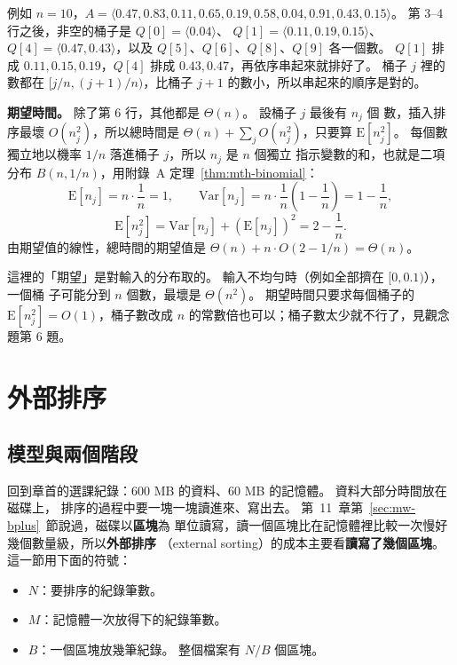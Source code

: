 例如 $n = 10$，$A = \langle 0.47, 0.83, 0.11, 0.65, 0.19, 0.58, 0.04, 0.91, 0.43,
0.15 \rangle$。 第 3--4 行之後，非空的桶子是 $Q[0] = \langle 0.04 \rangle$、
$Q[1] = \langle 0.11, 0.19, 0.15 \rangle$、$Q[4] = \langle 0.47, 0.43 \rangle$，以及
$Q[5]$、$Q[6]$、$Q[8]$、$Q[9]$ 各一個數。 $Q[1]$ 排成 $0.11, 0.15, 0.19$，$Q[4]$ 排成 $0.43, 0.47$，再依序串起來就排好了。 桶子
$j$ 裡的數都在 $[j/n, (j+1)/n)$，比桶子 $j + 1$ 的數小，所以串起來的順序是對的。

\textbf{期望時間。} 除了第 6 行，其他都是 $\Theta(n)$。 設桶子 $j$ 最後有 $n_j$ 個
數，插入排序最壞 $O(n_j^2)$，所以總時間是 $\Theta(n) + \sum_j O(n_j^2)$，只要算
$\mathrm{E}[n_j^2]$。 每個數獨立地以機率 $1/n$ 落進桶子 $j$，所以 $n_j$ 是 $n$ 個獨立
指示變數的和，也就是二項分布 $B(n, 1/n)$，用附錄~A 定理~\ref{thm:mth-binomial}：
\[
\mathrm{E}[n_j] = n \cdot \frac{1}{n} = 1, \qquad
\mathrm{Var}[n_j] = n \cdot \frac{1}{n}\left(1 - \frac{1}{n}\right) = 1 - \frac{1}{n},
\]
\[
\mathrm{E}[n_j^2] = \mathrm{Var}[n_j] + (\mathrm{E}[n_j])^2 = 2 - \frac{1}{n}.
\]
由期望值的線性，總時間的期望值是 $\Theta(n) + n \cdot O(2 - 1/n) = \Theta(n)$。

這裡的「期望」是對輸入的分布取的。 輸入不均勻時（例如全部擠在 $[0, 0.1)$），一個桶
子可能分到 $n$ 個數，最壞是 $\Theta(n^2)$。 期望時間只要求每個桶子的
$\mathrm{E}[n_j^2] = O(1)$，桶子數改成 $n$ 的常數倍也可以；桶子數太少就不行了，見觀念題第 6
題。


\section{外部排序}
\label{sec:lin-external}

\subsection{模型與兩個階段}

回到章首的選課紀錄：$600$ MB 的資料、$60$ MB 的記憶體。 資料大部分時間放在磁碟上，
排序的過程中要一塊一塊讀進來、寫出去。 第~11~章第~\ref{sec:mw-bplus}~節說過，磁碟以\textbf{區塊}為
單位讀寫，讀一個區塊比在記憶體裡比較一次慢好幾個數量級，所以\textbf{外部排序}
（external sorting）的成本主要看\textbf{讀寫了幾個區塊}。 這一節用下面的符號：

\begin{itemize}
\item $N$：要排序的紀錄筆數。
\item $M$：記憶體一次放得下的紀錄筆數。
\item $B$：一個區塊放幾筆紀錄。 整個檔案有 $N/B$ 個區塊。
\end{itemize}

